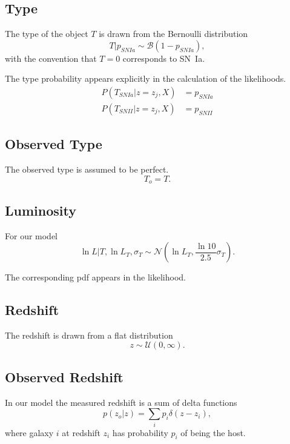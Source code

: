 \documentclass[preprint,3p]{elsarticle}
\begin{document}
\subsection{Type}
The type of the object $T$ is drawn from the Bernoulli distribution 
\begin{equation}
T | p_{SNIa} \sim \mathcal{B}(1-p_{SNIa}),
\end{equation}
with the convention that $T=0$ corresponds to SN~Ia.

The type probability appears explicitly in the calculation of the likelihoods.
\begin{align}
P(T_{SNIa} | z=z_j, X) &= p_{SNIa}\\
P(T_{SNII} | z=z_j, X) &= p_{SNII}
\end{align}
\subsection{Observed Type}
The observed type is assumed to be perfect.
\begin{equation}
T_o = T.
\end{equation}

\subsection{Luminosity}
For our model
\begin{equation}
\ln{L} | T, \ln{L}_{T},\sigma_{T} \sim \mathcal{N}\left( \ln{L}_{T},\frac{\ln{10}}{2.5}\sigma_{T}\right).
\end{equation}

The corresponding pdf appears in the likelihood.

\subsection{Redshift}
The redshift is drawn from a flat distribution
\begin{equation}
z\sim \mathcal{U}(0,\infty).
\end{equation}
%

\subsection{Observed Redshift}
In our model the measured redshift is a sum of delta functions
\begin{equation}
p(z_o|z) = \sum_i p_i \delta(z-z_i),
\end{equation}
where galaxy $i$ at
redshift $z_i$ has probability $p_i$ of being
the host.  
\end{document}
